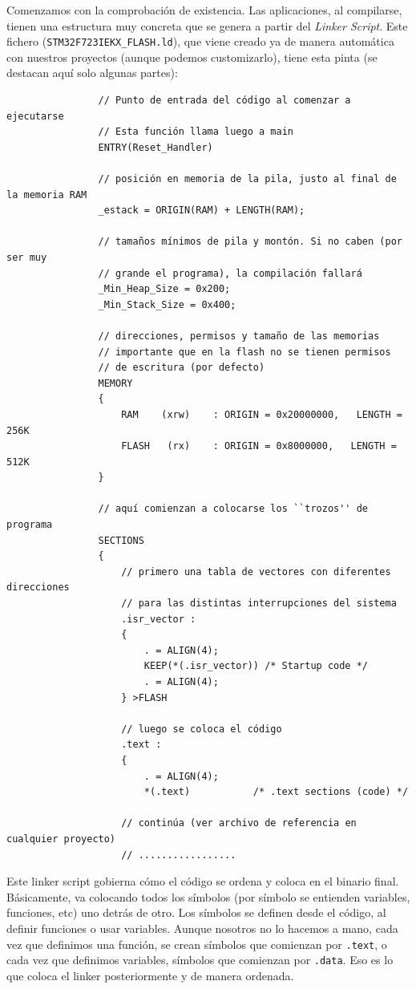 \documentclass[../main.tex]{subfiles}
\begin{document}
            Comenzamos con la comprobación de existencia. Las aplicaciones, al compilarse, tienen una estructura muy concreta que se genera a partir del \emph{Linker Script}. Este fichero (\texttt{STM32F723IEKX\_FLASH.ld}), que viene creado ya de manera automática con nuestros proyectos (aunque podemos customizarlo), tiene esta pinta (se destacan aquí solo algunas partes):

            \begin{lstlisting}
                // Punto de entrada del código al comenzar a ejecutarse
                // Esta función llama luego a main
                ENTRY(Reset_Handler)

                // posición en memoria de la pila, justo al final de la memoria RAM
                _estack = ORIGIN(RAM) + LENGTH(RAM); 

                // tamaños mínimos de pila y montón. Si no caben (por ser muy
                // grande el programa), la compilación fallará
                _Min_Heap_Size = 0x200;  
                _Min_Stack_Size = 0x400;

                // direcciones, permisos y tamaño de las memorias
                // importante que en la flash no se tienen permisos
                // de escritura (por defecto)
                MEMORY
                {
                    RAM    (xrw)    : ORIGIN = 0x20000000,   LENGTH = 256K
                    FLASH   (rx)    : ORIGIN = 0x8000000,   LENGTH = 512K
                }

                // aquí comienzan a colocarse los ``trozos'' de programa
                SECTIONS
                {
                    // primero una tabla de vectores con diferentes direcciones 
                    // para las distintas interrupciones del sistema
                    .isr_vector :
                    {
                        . = ALIGN(4);
                        KEEP(*(.isr_vector)) /* Startup code */
                        . = ALIGN(4);
                    } >FLASH

                    // luego se coloca el código
                    .text :
                    {
                        . = ALIGN(4);
                        *(.text)           /* .text sections (code) */

                    // continúa (ver archivo de referencia en cualquier proyecto)
                    // .................
            \end{lstlisting}

            Este linker script gobierna cómo el código se ordena y coloca en el binario final. Básicamente, va colocando todos los símbolos (por símbolo se entienden variables, funciones, etc) uno detrás de otro. Los símbolos se definen desde el código, al definir funciones o usar variables. Aunque nosotros no lo hacemos a mano, cada vez que definimos una función, se crean símbolos que comienzan por \texttt{.text}, o cada vez que definimos variables, símbolos que comienzan por \texttt{.data}. Eso es lo que coloca el linker posteriormente y de manera ordenada.
\end{document}
